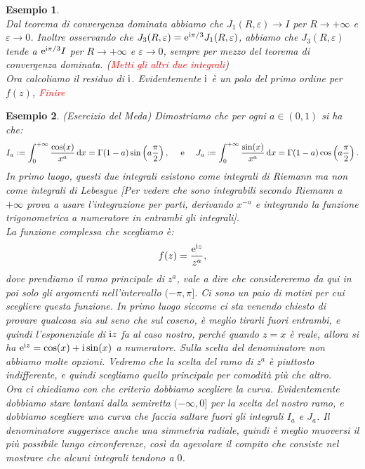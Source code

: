 \documentclass[11pt]{book}
\theoremstyle{Definizione}
\theoremstyle{TeoremaProposizioneLemmaCorollarioCongettura}
\theoremstyle{OsservazioneNotaEsempio}
\newtheorem{myes}{Esempio}[section]
\renewcommand{\i}{\textup{i}}
\newcommand{\e}{\textup{e}}
\renewcommand{\d}{\mathrm{d}}
\newcommand{\dx}{\,\d x}
\begin{document}
\begin{myes}
$$$$
Dal teorema di convergenza dominata abbiamo che $J_1(R,\varepsilon) \to I$ per $R\to +\infty$ e $\varepsilon\to 0$. Inoltre osservando che $J_3(R,\varepsilon) = \e^{\i\pi/3} J_1(R,\varepsilon)$, abbiamo che $J_3(R,\varepsilon)$ tende a $\e^{\i\pi/3}I$ per $R \to +\infty$ e $\varepsilon \to 0$, sempre per mezzo del teorema di convergenza dominata. (\textcolor{red}{Metti gli altri due integrali})\\
Ora calcoliamo il residuo di $\i$. Evidentemente $\i$ è un polo del primo ordine per $f(z)$, \textcolor{red}{Finire}
\end{myes}
\begin{myes}\textcolor{green!70!black}{(Esercizio del Meda)}
Dimostriamo che per ogni $a\in (0,1)$ si ha che:
$$
I_a := \int_{0}^{+\infty} \frac{\cos(x)}{x^a}\dx = \Gamma(1-a)\sin\left(a\frac{\pi}{2}\right),\quad \textup{ e }\quad J_a := \int_{0}^{+\infty} \frac{\sin(x)}{x^a}\dx = \Gamma(1-a)\cos\left(a\frac{\pi}{2}\right).
$$
In primo luogo, questi due integrali esistono come integrali di Riemann ma non come integrali di Lebesgue [Per vedere che sono integrabili secondo Riemann a $+\infty$ prova a usare l'integrazione per parti, derivando $x^{-a}$ e integrando la funzione trigonometrica a numeratore in entrambi gli integrali].\\
La funzione complessa che scegliamo è:
$$
f(z) = \frac{\e^{\i z}}{z^a},
$$
dove prendiamo il ramo principale di $z^a$, vale a dire che considereremo da qui in poi solo gli argomenti nell'intervallo $(-\pi,\pi]$. Ci sono un paio di motivi per cui scegliere questa funzione. In primo luogo siccome ci sta venendo chiesto di provare qualcosa sia sul seno che sul coseno, è meglio tirarli fuori entrambi, e quindi l'esponenziale di $\i z$ fa al caso nostro, perché quando $z = x$ è reale, allora si ha $\e^{\i z} = \cos(x)+\i\sin(x)$ a numeratore. Sulla scelta del denominatore non abbiamo molte opzioni. Vedremo che la scelta del ramo di $z^a$ è piuttosto indifferente, e quindi scegliamo quello principale per comodità più che altro.\\
Ora ci chiediamo con che criterio dobbiamo scegliere la curva. Evidentemente dobbiamo stare lontani dalla semiretta $(-\infty,0]$ per la scelta del nostro ramo, e dobbiamo scegliere una curva che faccia saltare fuori gli integrali $I_a$ e $J_a$. Il denominatore suggerisce anche una simmetria radiale, quindi è meglio muoversi il più possibile lungo circonferenze, così da agevolare il compito che consiste nel mostrare che alcuni integrali tendono a $0$.\\

\end{myes}
\end{document}
